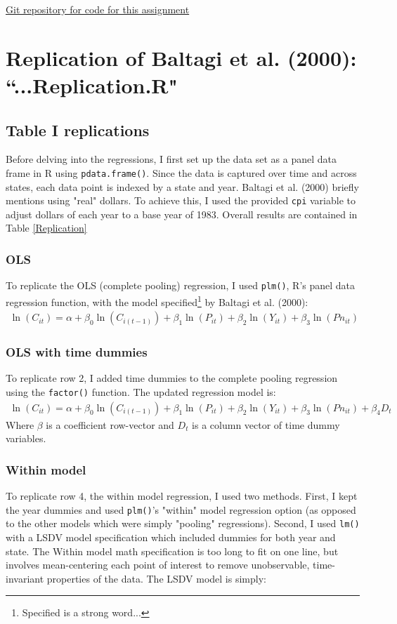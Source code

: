 \documentclass{article}
\begin{document}
\hyperref{https://github.com/patricksheehan/19704}{}{}{Git repository for code for this assignment}

\section{Replication of Baltagi et al. (2000): ``...Replication.R"}
\subsection{Table I replications}
Before delving into the regressions, I first set up the data set as a panel data frame in R using \verb|pdata.frame()|. Since the data is captured over time and across states, each data point is indexed by a state and year. Baltagi et al. (2000) briefly mentions using "real" dollars. To achieve this, I used the provided \verb|cpi| variable to adjust dollars of each year to a base year of 1983. Overall results are contained in Table \ref{Replication}

\subsubsection{OLS}
To replicate the OLS (complete pooling) regression, I used \verb|plm()|, R's panel data regression function, with the model specified\footnote{Specified is a strong word...} by Baltagi et al. (2000):
\begin{align}
\ln(C_{it}) = \alpha + \beta_0\ln(C_{i(t-1)}) + \beta_1\ln(P_{it}) + 
		   \beta_2\ln(Y_{it}) + \beta_3\ln(Pn_{it})
\end{align}

\subsubsection{OLS with time dummies}
To replicate row 2, I added time dummies to the complete pooling regression using the \verb|factor()| function. The updated regression model is:
\begin{align}
\ln(C_{it}) = \alpha + \beta_0\ln(C_{i(t-1)}) + \beta_1\ln(P_{it}) + 
		   \beta_2\ln(Y_{it}) + \beta_3\ln(Pn_{it}) + \beta_4 D_t
\end{align}
Where $\beta$ is a coefficient row-vector and $D_t$ is a column vector of time dummy variables.

\subsubsection{Within model}
To replicate row 4, the within model regression, I used two methods. First, I kept the year dummies and used \verb|plm()|'s "within" model regression option (as opposed to the other models which were simply "pooling" regressions). Second, I used \verb|lm()| with a LSDV model specification which included dummies for both year and state. The Within model math specification is too long to fit on one line, but involves mean-centering each point of interest to remove unobservable, time-invariant properties of the data. The LSDV model is simply:
\end{document}

